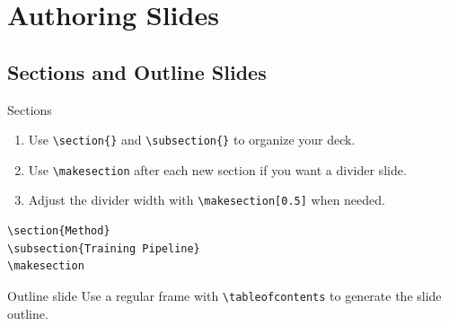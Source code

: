 \documentclass[8pt]{beamer}
\begin{document}
\section{Authoring Slides}

\makesection

\subsection{Sections and Outline Slides}

\begin{frame}[fragile]{\insertsection}{\insertsubsection}

    \begin{block}{Sections}
        \begin{enumerate}
            \item Use \lstinline|\section{}| and \lstinline|\subsection{}| to organize your deck.
            \item Use \lstinline|\makesection| after each new section if you want a divider slide.
            \item Adjust the divider width with \lstinline|\makesection[0.5]| when needed.
        \end{enumerate}
    \end{block}

    \begin{lstlisting}[style=latex]
\section{Method}
\subsection{Training Pipeline}
\makesection
    \end{lstlisting}

    \begin{block}{Outline slide}
        Use a regular frame with \lstinline|\tableofcontents| to generate the slide outline.
    \end{block}

\end{frame}
\end{document}
